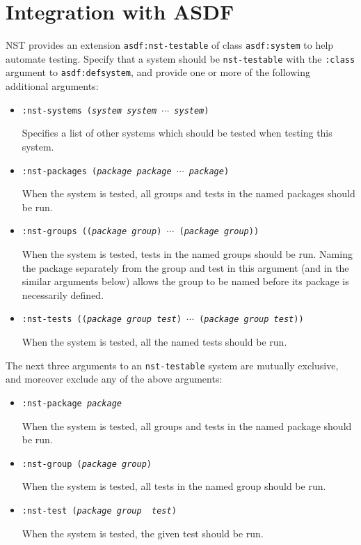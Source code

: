 \section{Integration with ASDF}
NST provides an extension \texttt{asdf:nst-testable} of class
\texttt{asdf:system} to help automate testing.  Specify that a system
should be \texttt{nst-testable} with the \texttt{:class} argument to
\texttt{asdf:defsystem}, and provide one or more of the following
additional arguments:
\begin{itemize}
\item\texttt{:nst-systems ({\slshape system} {\slshape system}
    $\cdots$ {\slshape system})}\par Specifies a list of other systems
  which should be tested when testing this system.
\item\texttt{:nst-packages ({\slshape package} {\slshape package}
    $\cdots$ {\slshape package})}\par When the system is tested, all
  groups and tests in the named packages should be run.
\item\texttt{:nst-groups (({\slshape package} {\slshape group})
    $\cdots$ ({\slshape package} {\slshape group}))}\par When the
  system is tested, tests in the named groups should be run.  Naming
  the package separately from the group and test in this argument (and
  in the similar arguments below) allows the group to be named before
  its package is necessarily defined.
\item\texttt{:nst-tests (({\slshape package} {\slshape group}
    {\slshape test}) $\cdots$ ({\slshape package} {\slshape group}
    {\slshape test}))}\par When the system is tested, all the named
  tests should be run.
\end{itemize}
The next three arguments to an \texttt{nst-testable} system are
mutually exclusive, and moreover exclude any of the above arguments:
\begin{itemize}
\item\texttt{:nst-package {\slshape package}}\par When the system is
  tested, all groups and tests in the named package should be run.
\item\texttt{:nst-group ({\slshape package} {\slshape group})}\par
  When the system is tested, all tests in the named group should be
  run.
\item\texttt{:nst-test ({\slshape package} {\slshape group} {\slshape
      test})}\par When the system is tested, the given test should be
  run.
\end{itemize}
